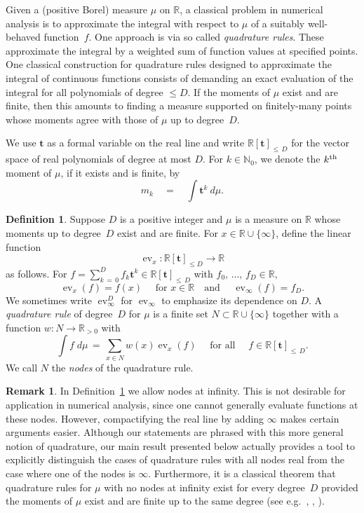 \documentclass[11pt]{article}
\theoremstyle{definition}
\newtheorem{defi}[theo]{Definition}
\newtheorem{rema}[theo]{Remark}
\numberwithin{equation}{section}
\numberwithin{figure}{section}
\numberwithin{table}{section}
\DeclareMathOperator\ev{ev}
\newcommand\N{\mathbb N}
\newcommand\R{\mathbb R}
\renewcommand\t{\mathbf{t}}
\begin{document}
Given a (positive Borel) measure $\mu$ on $\R$, a classical problem in numerical analysis is to approximate the integral with respect to $\mu$ of a suitably well-behaved function~$f$. One approach is via so called \emph{quadrature rules}. These approximate the integral by a weighted sum of function values at specified points. One classical construction for quadrature rules designed to approximate the integral of continuous functions consists of demanding an exact evaluation of the integral for all polynomials of degree $\leq D$. If the moments of $\mu$ exist and are finite, then this amounts to finding a measure supported on finitely-many points whose moments agree with those of $\mu$ up to degree~$D$.

We use $\t$ as a formal variable on the real line and write $\R[\t]_{\leq\,D}$ for the vector space of real polynomials of degree at most $D$. For $k \in
\N_0$, we denote the $k^{\rm th}$ moment of $\mu$, if it exists and is finite, by
\[
m_k \quad = \quad \int \t^k \ d\mu.
\]

\begin{defi}\label{dfqr}
Suppose $D$ is a positive integer and $\mu$ is a measure on $\R$ whose moments up to degree~$D$ exist and are finite. For $x \in \R \cup \{\infty\}$, define the linear function
\[
\ev_x:\R[\t]_{\leq D} \rightarrow \R
\]
as follows. For $f = \sum_{k\,=\,0}^Df_k \t^k \in \R[\t]_{\leq\,D}$ with $f_0,\,\ldots,\,f_D\in\R,$
\[
\ev_x(f) = f(x) \quad \text{ for }x\in \R \quad \text{and } \quad \ev_{\infty}(f) = f_D.
\]
We sometimes write $\ev_{\infty}^D$ for $\ev_{\infty}$ to emphasize its dependence on $D$. A \emph{quadrature rule} of degree~$D$ for $\mu$ is a finite set $N\subset \R\cup\{\infty\}$ together with a function $w\colon N\to\R_{>0}$ with
\[
\int f \; d \mu \, = \, \sum_{x\in N}w(x) \ev_x(f) \quad \text{ for all }\quad f\in\R[\t]_{\leq\,D}.
\]
We call $N$ the \emph{nodes} of the quadrature rule.
\end{defi}


\begin{rema}
In Definition~\ref{dfqr} we allow nodes at infinity. This is not desirable for application in numerical analysis, since one cannot generally evaluate functions at these nodes. However, compactifying the real line by adding $\infty$ makes certain arguments easier. Although our statements are phrased with this more general notion of quadrature, our main result presented below actually provides a tool to explicitly distinguish the cases of quadrature rules with all nodes real from the case where one of the nodes is $\infty$. Furthermore, it is a classical theorem that quadrature rules for $\mu$ with no nodes at infinity exist for every degree~$D$ provided the moments of $\mu$ exist and are finite up to the same degree (see e.g.~\cite[Theorem~5.8]{la1}, \cite[Theorem~5.9]{la2}, \cite[Theorem~1.24]{sch}).
\end{rema}
\end{document}
